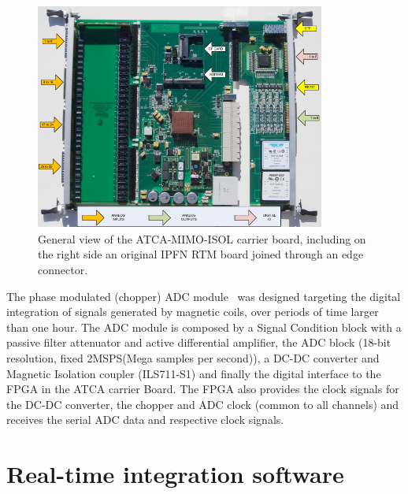 \begin{figure}[htbp]
	\centering
	\includegraphics[width=0.85\textwidth]{Chp4/ATCA_MIMO_ISOL.png}
	\caption{\label{ATCA_ISOL} General view of the ATCA-MIMO-ISOL carrier board, including on the right side an original IPFN RTM board joined through an edge connector. }
\end{figure}

The phase modulated (chopper) ADC module~\cite{Batista2010} was designed targeting the digital integration of signals generated by magnetic coils, over periods of time larger
than one hour. The ADC module is composed by a  Signal Condition block with a passive filter attenuator and active differential amplifier, the ADC block (18-bit resolution, fixed 2MSPS(Mega samples per second)), a DC-DC converter and Magnetic Isolation coupler (ILS711-S1) and finally the digital interface to the FPGA in the ATCA carrier Board. The FPGA also provides the clock signals for the DC-DC converter, the chopper and ADC clock (common to all channels) and receives the serial ADC data and respective clock signals.




\section{Real-time  integration software}

